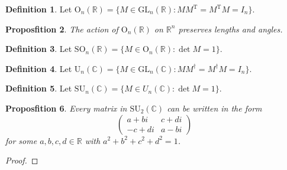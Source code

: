 \documentclass{book}
\let\qed\relax
\newtheorem{prop}{Proposfition}[chapter]
\theoremstyle{definition}
\newtheorem{df}[prop]{Definition}
\newcommand{\inv}[1]{\ensuremath{{#1}^{-1}}}
\begin{document}
\begin{df}
Let $\mathrm{O}_n(\mathbb{R}) = \{ M \in \mathrm{GL}_n(\mathbb{R}) : M M^\mathrm{T} = M^\mathrm{T} M = I_n \}$.
\end{df}

\begin{prop}
The action of $\mathrm{O}_n(\mathbb{R})$ on $\mathbb{R}^n$ preserves lengths and angles.
\end{prop}


\begin{df}
Let $\mathrm{SO}_n(\mathbb{R}) = \{ M \in \mathrm{O}_n(\mathbb{R}) : \det M = 1 \}$.
\end{df}

\begin{df}
Let $\mathrm{U}_n(\mathbb{C}) = \{ M \in \mathrm{GL}_n(\mathbb{C}) : M M^\dagger = M^\dagger M = I_n \}$.
\end{df}

\begin{df}
Let $\mathrm{SU}_n(\mathbb{C}) = \{ M \in U_n(\mathbb{C}) : \det M = 1 \}$.
\end{df}

\begin{prop}
Every matrix in $\mathrm{SU}_2(\mathbb{C})$ can be written in the form
\[ \left( \begin{array}{cc}
a + b i & c + d i \\
-c + di & a - bi
\end{array} \right) \]
for some $a,b,c,d \in \mathbb{R}$ with $a^2 + b^2 + c^2 + d^2 = 1$.
\end{prop}

\begin{proof}
\pf
{}
\step{2}{$\inv{M} = M^\dagger$}
\qed
\end{proof}
\end{document}
